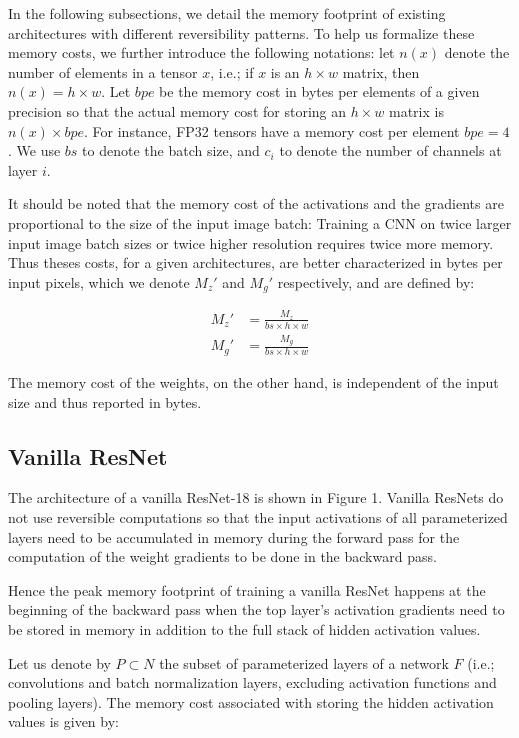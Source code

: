 \documentclass[twocolumn]{bmcart}
\begin{document}
In the following subsections, we detail the memory footprint of existing architectures with different reversibility patterns.
To help us formalize these memory costs, we further introduce the following notations:
let $n(x)$ denote the number of elements in a tensor $x$, i.e.; if $x$ is an $h \times w$ matrix, then $n(x)=h \times w$.
Let $bpe$ be the memory cost in bytes per elements of a given precision so that the actual memory cost for storing an $h \times w$ matrix is $n(x) \times bpe$.
For instance, FP32 tensors have a memory cost per element $bpe=4$.
We use $bs$ to denote the batch size, and $c_i$ to denote the number of channels at layer $i$.

It should be noted that the memory cost of the activations and the gradients are proportional to the size of the input image batch:
Training a CNN on twice larger input image batch sizes or twice higher resolution requires twice more memory.
Thus theses costs, for a given architectures, are better characterized in bytes per input pixels,
which we denote $M_{z}'$ and $M_{g}'$ respectively, and are defined by:

\begin{subequations}
\begin{align}
M_{z}' &= \frac{M_{z}}{bs \times h \times w}  \\
M_{g}' &= \frac{M_{g}}{bs \times h \times w}
\end{align}
\end{subequations}

The memory cost of the weights, on the other hand, is independent of the input size and thus reported in bytes.

\subsection{Vanilla ResNet}

The architecture of a vanilla ResNet-18 is shown in Figure 1.
Vanilla ResNets do not use reversible computations so that the input activations of all parameterized layers need to be accumulated
in memory during the forward pass for the computation of the weight gradients to be done in the backward pass.

Hence the peak memory footprint of training a vanilla ResNet happens at the beginning of the backward pass
when the top layer's activation gradients need to be stored in memory in addition to the full stack of hidden activation values.

Let us denote by $P \subset N$ the subset of parameterized layers of a network $F$
(i.e.; convolutions and batch normalization layers, excluding activation functions and pooling layers).
The memory cost associated with storing the hidden activation values is given by:
\end{document}

